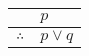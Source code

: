 \documentclass{standalone}
\begin{document}
\begin{tabular}{rl}
    & $p$ \\
    \hline
    $\therefore$ & $p \lor q$
\end{tabular}
\end{document}
